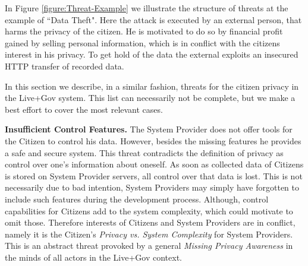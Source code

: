 In Figure \ref{figure:Threat-Example} we illustrate the structure of threats at the example of ``Data Theft".
Here the attack is executed by an external person, that harms the privacy of the citizen.
He is motivated to do so by financial profit gained by selling personal information, which is in conflict with the citizens interest in his privacy.
To get hold of the data the external exploits an insecured HTTP transfer of recorded data.

In this section we describe, in a similar fashion, threats for the citizen privacy in the Live+Gov system.
This list can necessarily not be complete, but we make a best effort to cover the most relevant cases.



%
%
\textbf{Insufficient Control Features.}
The System Provider does not offer tools for the Citizen to control his data.
However, besides the missing features he provides a safe and secure system.
This threat contradicts the definition of privacy as control over one's information about oneself.
As soon as collected data of Citizens is stored on System Provider servers, all control over that data is lost.
This is not necessarily due to bad intention, System Providers may simply have forgotten to include such features during the development process.
Although, control capabilities for Citizens add to the system complexity, which could motivate to omit those. 
Therefore interests of Citizens and System Providers are in conflict, namely it is the Citizen's \textit{Privacy vs. System Complexity} for System Providers.
This is an abstract threat provoked by a general \textit{Missing Privacy Awareness} in the minds of all actors in the Live+Gov context.


